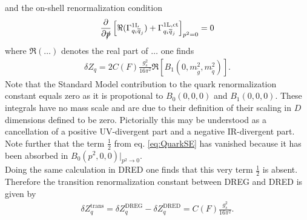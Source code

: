 and the on-shell renormalization condition
\begin{align}
\frac{\partial}{\partial \slashed{p}} \left[ \Re (\Gamma^{\mathrm{1L}}_{q_i\overline{q}_j}) + \Gamma^{\mathrm{1L,ct}}_{q_i\overline{q}_j}  \right]_{p^2 = 0} = 0
\end{align}
where $\Re (\hdots)$ denotes the real part of $\hdots$ one finds
\begin{align}
\delta Z_q = 2 C(F) \frac{g_s^2}{16\pi^2} \Re \left[ B_1(0 ,m_{\tilde{g}}^2,m_{\tilde{q}}^2) \right].
\end{align}
Note that the Standard Model contribution to the quark renormalization constant equals zero as it is propotional to $B_0(0,0,0)$ and $B_1(0,0,0)$. These integrals have no mass scale and are due to their definition of their scaling in $D$ dimensions\cite{Collins:105730} defined to be zero. Pictorially this may be understood as a cancellation of a positive UV-divergent part and a negative IR-divergent part. Note further that the term $\frac{1}{2}$ from eq. \eqref{eq:QuarkSE} has vanished because it has been absorbed in $B_0(p^2,0,0)|_{p^2 \to 0}$.\\
Doing the same calculation in DRED one finds that this very term $\frac{1}{2}$ is absent. Therefore the transition renormalization constant between DREG and DRED is given by
\begin{align}
\delta Z_q^{\mathrm{trans}} = \delta Z_q^{\mathrm{DREG}} - \delta Z_q^{\mathrm{DRED}} = C(F) \frac{g_s^2}{16\pi^2}.\label{eq:QuarkSC}
\end{align}

